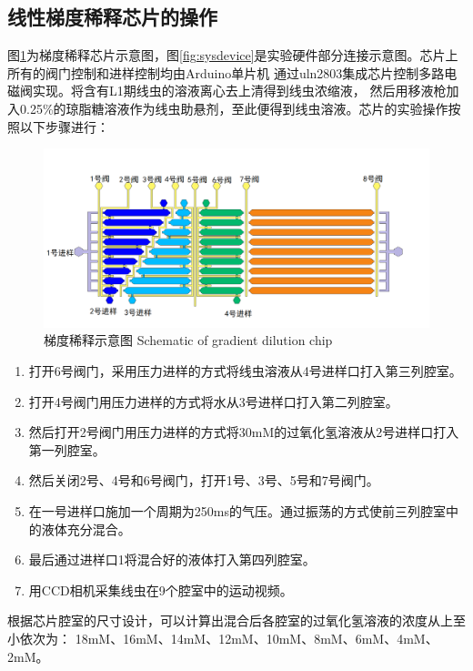 \subsection{线性梯度稀释芯片的操作}
	图\ref{fig:chap5:chip}为梯度稀释芯片示意图，图\ref{fig:sysdevice}是实验硬件部分连接示意图。芯片上所有的阀门控制和进样控制均由Arduino单片机
	通过uln2803集成芯片控制多路电磁阀实现。将含有L1期线虫的溶液离心去上清得到线虫浓缩液，
	然后用移液枪加入0.25\%的琼脂糖溶液作为线虫助悬剂，至此便得到线虫溶液。芯片的实验操作按照以下步骤进行：
	\begin{figure}[!t]
	  \centering
	  \includegraphics[width=14cm]{figure/chap5/chip.png}
	  \bicaption
		{梯度稀释示意图}
		{Schematic of gradient dilution chip }
	  \label{fig:chap5:chip}
	\end{figure}

	
	\begin{enumerate}[label={(\arabic*)},font={\color{black!50!black}\bfseries}]
	\item 打开6号阀门，采用压力进样的方式将线虫溶液从4号进样口打入第三列腔室。
	\item 打开4号阀门用压力进样的方式将水从3号进样口打入第二列腔室。
	\item 然后打开2号阀门用压力进样的方式将30mM的过氧化氢溶液从2号进样口打入第一列腔室。
	\item 然后关闭2号、4号和6号阀门，打开1号、3号、5号和7号阀门。
	\item 在一号进样口施加一个周期为250ms的气压。通过振荡的方式使前三列腔室中的液体充分混合。
	\item 最后通过进样口1将混合好的液体打入第四列腔室。
	\item 用CCD相机采集线虫在9个腔室中的运动视频。
	\end{enumerate}
	根据芯片腔室的尺寸设计，可以计算出混合后各腔室的过氧化氢溶液的浓度从上至小依次为：
	18mM、16mM、14mM、12mM、10mM、8mM、6mM、4mM、2mM。

